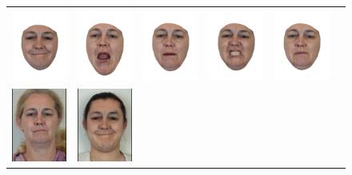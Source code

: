 \begin{figure}
\begin{tabular}{cccccc}
\includegraphics[width=.1535\textwidth]{figures/results/kat_on_zimo/light000018.png}&
\includegraphics[width=.1535\textwidth]{figures/results/kat_on_zimo/light000209.png}&
\includegraphics[width=.1535\textwidth]{figures/results/kat_on_zimo/light000284.png}&
\includegraphics[width=.1535\textwidth]{figures/results/kat_on_zimo/light000311.png}&
\includegraphics[width=.1535\textwidth]{figures/results/kat_on_zimo/light000336.png}\\
\includegraphics[width=.1535\textwidth]{figures/results/kat_on_zimo/katframe.jpg}&
\includegraphics[width=.1535\textwidth]{figures/results/kat_on_zimo/composite000018.jpg}&

\end{tabular}
\end{figure}
